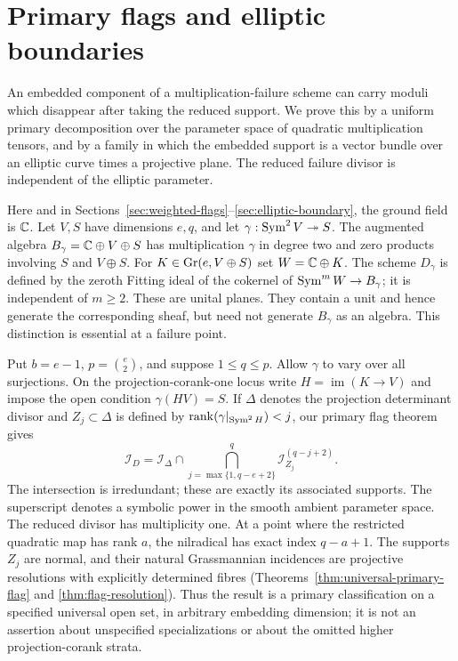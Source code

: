 \section{Primary flags and elliptic boundaries}
\label{sec:v121-introduction}
An embedded component of a multiplication-failure scheme can carry
moduli which disappear after taking the reduced support. We prove this
by a uniform primary decomposition over the parameter space of quadratic
multiplication tensors, and by a family in which the embedded support
is a vector bundle over an elliptic curve times a projective plane.
The reduced failure divisor is independent of the elliptic parameter.

Here and in Sections~\ref{sec:weighted-flags}--\ref{sec:elliptic-boundary},
the ground field is $\mathbb C$. Let $V,S$ have dimensions $e,q$, and let
$\gamma:\operatorname{Sym}^2 V\twoheadrightarrow S$. The augmented algebra
$B_\gamma=\mathbb C\oplus V\oplus S$ has multiplication $\gamma$ in degree two
and zero products involving $S$ and $V\oplus S$.
For $K\in\operatorname{Gr}(e,V\oplus S)$ set $W=\mathbb C\oplus K$.
The scheme $D_\gamma$ is defined by the zeroth Fitting ideal of the
cokernel of $\operatorname{Sym}^m W\to B_\gamma$; it is independent of $m\ge2$.
These are unital planes. They contain a unit and hence generate the
corresponding sheaf, but need not generate $B_\gamma$ as an algebra.
This distinction is essential at a failure point.

Put $b=e-1$, $p=\binom e2$, and suppose $1\le q\le p$.
Allow $\gamma$ to vary over all surjections. On the projection-corank-one
locus write $H=\operatorname{im}(K\to V)$ and impose the open condition
$\gamma(HV)=S$. If $\Delta$ denotes the projection determinant divisor
and $Z_j\subset\Delta$ is defined by
$\operatorname{rank}(\gamma|_{\operatorname{Sym}^2 H})<j$, our primary flag theorem gives
\begin{equation}\label{eq:v121-intro-flag}
 \mathcal I_D=\mathcal I_\Delta\cap
 \bigcap_{j=\max\{1,q-e+2\}}^q
             \mathcal I_{Z_j}^{(q-j+2)}.
\end{equation}
The intersection is irredundant; these are exactly its associated
supports. The superscript denotes a symbolic power in the smooth
ambient parameter space. The reduced divisor has multiplicity one.
At a point where the restricted quadratic map has rank $a$, the
nilradical has exact index $q-a+1$. The supports $Z_j$ are normal,
and their natural Grassmannian incidences are projective resolutions
with explicitly determined fibres
(Theorems~\ref{thm:universal-primary-flag} and
\ref{thm:flag-resolution}). Thus the result is a primary classification
on a specified universal open set, in arbitrary embedding dimension;
it is not an assertion about unspecified specializations or about the
omitted higher projection-corank strata.

